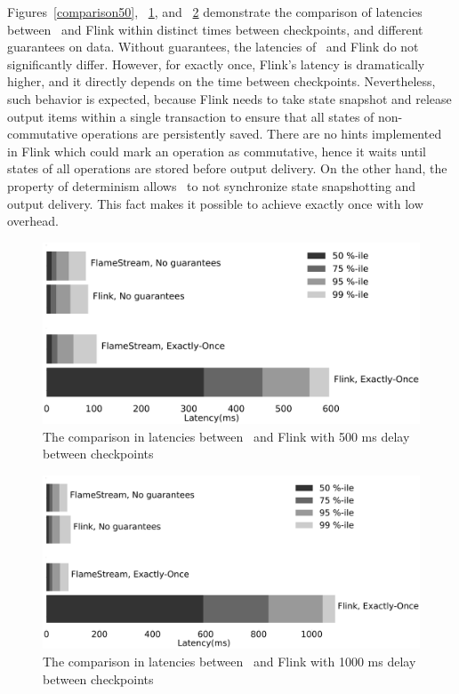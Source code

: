 Figures~\ref{comparison50}, ~\ref{comparison500}, and ~\ref{comparison1000} demonstrate      the comparison of latencies between \FlameStream\ and Flink within distinct times between checkpoints, and different guarantees on data. Without guarantees, the latencies of \FlameStream\ and Flink do not significantly differ. However, for exactly once, Flink's latency is dramatically higher, and it directly depends on the time between checkpoints. Nevertheless, such behavior is expected, because Flink needs to take state snapshot and release output items within a single transaction to ensure that all states of non-commutative operations are persistently saved. There are no hints implemented in Flink which could mark an operation as commutative, hence it waits until states of all operations are stored before output delivery. On the other hand, the property of determinism allows \FlameStream\ to not synchronize state snapshotting and output delivery. This fact makes it possible to achieve exactly once with low overhead.

\begin{figure}[htbp]
  \centering
  \includegraphics[width=.5\textwidth]{pics/comparison500}
  \caption{The comparison in latencies between \FlameStream\ and Flink with 500 ms delay between checkpoints}
  \label {comparison500}
\end{figure}

\begin{figure}[htbp]
  \centering
  \includegraphics[width=.5\textwidth]{pics/comparison1000}
  \caption{The comparison in latencies between \FlameStream\ and Flink with 1000 ms delay between checkpoints}
  \label {comparison1000}
\end{figure}
